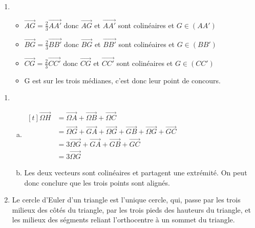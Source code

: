 \documentclass[12pt, a4paper]{article}
\begin{document}
\begin{Exercise}[number={149}]
\begin{enumerate}[1)]
        \item   \begin{itemize}
                    \item[] $\overrightarrow{AG}=\frac{2}{3}\overrightarrow{AA'}$ donc $\overrightarrow{AG}$ et $\overrightarrow{AA'}$ sont colinéaires et $G\in(AA')$
                    \item[] $\overrightarrow{BG}=\frac{2}{3}\overrightarrow{BB'}$ donc $\overrightarrow{BG}$ et $\overrightarrow{BB'}$ sont colinéaires et $G\in(BB')$
                    \item[] $\overrightarrow{CG}=\frac{2}{3}\overrightarrow{CC'}$ donc $\overrightarrow{CG}$ et $\overrightarrow{CC'}$ sont colinéaires et $G\in(CC')$
                    \item[] G est sur les trois médianes, c'est donc leur point de concours.
                \end{itemize}
    \end{enumerate}
\end{Exercise}

\begin{Exercise}[number={152}]
    \begin{enumerate}[1)]
        \item	\begin{enumerate}[a)]
                    \item	$\begin{aligned}[t]
                                \overrightarrow{\Omega H}&=\overrightarrow{\Omega A}+\overrightarrow{\Omega B}+\overrightarrow{\Omega C} &\\
                                &=\overrightarrow{\Omega G}+\overrightarrow{GA}+\overrightarrow{\Omega G}+\overrightarrow{GB}+\overrightarrow{\Omega G}+\overrightarrow{GC} &\\
                                &=3\overrightarrow{\Omega G}+\overrightarrow{GA}+\overrightarrow{GB}+\overrightarrow{GC} &\\
                                &=3\overrightarrow{\Omega G}
                            \end{aligned}$
                    \item   Les deux vecteurs sont colinéaires et partagent une extrémité. On peut donc conclure que les trois points sont alignés.
                \end{enumerate}
        \item   Le cercle d'Euler d'un triangle est l'unique cercle, qui, passe par les trois milieux des côtés du triangle, par les trois pieds des hauteurs du triangle, et les milieux des ségments reliant l'orthocentre à un sommet du triangle.
    \end{enumerate}
\end{Exercise}
\end{document}
